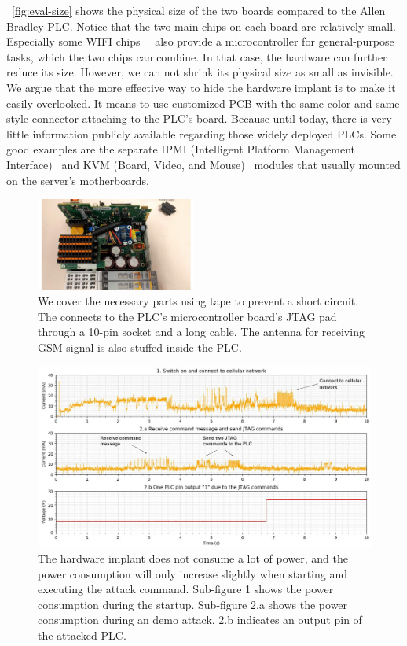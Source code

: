 ~\autoref{fig:eval-size} shows the physical size of the two boards compared to the Allen Bradley PLC. Notice that the two main chips on each board are relatively small. Especially some WIFI chips~\cite{babiuch2019using}~\cite{artenstein2017broadpwn} also provide a microcontroller for general-purpose tasks, which the two chips can combine.  In that case, the hardware can further reduce its size. However, we can not shrink its physical size as small as invisible.  We argue that the more effective way to hide the hardware implant is to make it easily overlooked. It means to use customized PCB with the same color and same style connector attaching to the PLC's board. Because until today, there is very little information publicly available regarding those widely deployed PLCs.  Some good examples are the separate IPMI (Intelligent Platform Management Interface)~\cite{slaight2003using} and KVM (Board, Video, and Mouse)~\cite{kedziorek2007hpc} modules that usually mounted on the server's motherboards.

\begin{figure}[h]
	\includegraphics[width=0.47\textwidth]{figures/eval-a}
	\centering
	\caption{We cover the necessary parts using tape to prevent a short circuit. The \name connects to the PLC's microcontroller board's JTAG pad through a 10-pin socket and a long cable. The antenna for receiving GSM signal is also stuffed inside the PLC.}
	\label{fig:eval-a}
\end{figure}

\begin{figure}[t]
	\includegraphics[width=\textwidth]{figures/current}
	\centering
	\caption{The hardware implant does not consume a lot of power, and the power consumption will only increase slightly when starting and executing the attack command. Sub-figure 1 shows the power consumption during the startup. Sub-figure 2.a shows the power consumption during an demo attack. 2.b indicates an output pin of the attacked PLC. }
	\label{fig:current}
\end{figure}

